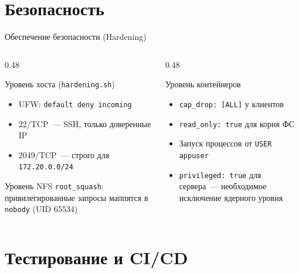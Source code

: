 \documentclass[aspectratio=169,14pt]{beamer}
\begin{document}
	\section{Безопасность}
	
	\begin{frame}{Обеспечение безопасности (Hardening)}
		\begin{columns}[T]
			\begin{column}{0.48\textwidth}
				\begin{block}{Уровень хоста (\texttt{hardening.sh})}
					\begin{itemize}
						\item UFW: \texttt{default deny incoming}
						\item 22/TCP~— SSH, только доверенные IP
						\item 2049/TCP~— строго для \texttt{172.20.0.0/24}
					\end{itemize}
				\end{block}
				\begin{block}{Уровень NFS}
					\footnotesize\texttt{root\_squash}: привилегированные запросы маппятся в \texttt{nobody} (UID 65534)
				\end{block}
			\end{column}
			\begin{column}{0.48\textwidth}
				\begin{block}{Уровень контейнеров}
					\begin{itemize}\footnotesize
						\item \texttt{cap\_drop: [ALL]} у клиентов
						\item \texttt{read\_only: true} для корня ФС
						\item Запуск процессов от \texttt{USER appuser}
						\item \texttt{privileged: true} для сервера~— необходимое исключение ядерного уровня
					\end{itemize}
				\end{block}
			\end{column}
		\end{columns}
	\end{frame}
	
	\section{Тестирование и CI/CD}
	
\end{document}
